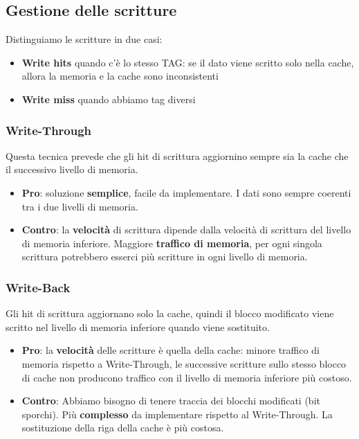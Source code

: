 \subsection{Gestione delle scritture}
Distinguiamo le scritture in due casi:
\begin{itemize}
	\item \textbf{Write hits} quando c'è lo stesso TAG: se il dato viene scritto solo nella cache, allora la memoria e la cache sono inconsistenti
	\item \textbf{Write miss} quando abbiamo tag diversi
\end{itemize}

\subsubsection{Write-Through}
Questa tecnica prevede che gli hit di scrittura aggiornino sempre sia la cache che il successivo livello di memoria.
\begin{itemize}
	\item \textbf{Pro}: soluzione \textbf{semplice}, facile da implementare. I dati sono sempre coerenti tra i due livelli di memoria.
	\item \textbf{Contro}: la \textbf{velocità} di scrittura dipende dalla velocità di scrittura del livello di memoria inferiore. Maggiore \textbf{traffico di memoria}, per ogni singola scrittura potrebbero esserci più scritture in ogni livello di memoria.
\end{itemize}

\subsubsection{Write-Back}
Gli hit di scrittura aggiornano solo la cache, quindi il blocco modificato viene scritto nel livello di memoria inferiore quando viene sostituito. 
\begin{itemize}
	\item \textbf{Pro}: la \textbf{velocità} delle scritture è quella della cache: minore traffico di memoria rispetto a Write-Through, le successive scritture sullo stesso blocco di cache non producono traffico con il livello di memoria inferiore più costoso.
	\item \textbf{Contro}: 
	Abbiamo bisogno di tenere traccia dei blocchi modificati (bit sporchi). Più \textbf{complesso} da implementare rispetto al Write-Through. La sostituzione della riga della cache è più costosa.
\end{itemize}

